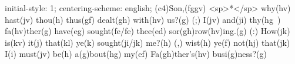 initial-style: 1;
centering-scheme: english;
(c4)Son,(fggv) <sp>*</sp> why(hv) hast(jv) thou(h) thus(gf) dealt(gh) with(hv) us?(g) (;) I(jv) and(ji) thy(hg~) fa(hv)ther(g) have(eg) sought(fe/fe) thee(ed) sor(gh)row(hv)ing.(g) (:) How(jk) is(kv) it(j) that(kl) ye(k) sought(ji/jk) me?(h) (,) wist(h) ye(f) not(hj) that(jk) I(i) must(jv) be(h) a(g)bout(hg) my(ef) Fa(gh)ther's(hv) busi(g)ness?(g)
